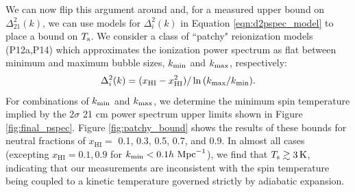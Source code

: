 \documentclass[twocolumn,numberedappendix]{emulateapj} \shorttitle{New Limits on the 21 cm Power Spectrum at $z=8.4$}
\newcommand{\hMpci}{h\ {\rm Mpc}^{-1}}
\newcommand{\Tspin}{T_{\rm s}}
\newcommand{\kmin}{k_{\rm min}}
\newcommand{\kmax}{k_{\rm max}}
\begin{document}
We can now flip this argument around and, for a measured upper bound on $\Delta^2_{21}(k)$, we
can use models for $\Delta_i^2(k)$ in Equation \eqref{eqn:d2pspec_model} to place a bound
on $\Tspin$.  
%
We consider a class of ``patchy" reionization models (P12a,P14) which
approximates the ionization power spectrum as flat between minimum and maximum
bubble sizes, $\kmin$ and $\kmax$, respectively:
\begin{equation}\label{eqn:patchy_bound}
    \Delta^{2}_{i}(k) = (x_{\text{HI}} -
x_{\text{HI}}^{2})/\ln{(\kmax/\kmin)}.
\end{equation}
For combinations of $\kmin$ and $\kmax$,
we 
determine the minimum spin temperature 
implied by the $2\sigma$ 21 cm power
spectrum upper limits shown in Figure \ref{fig:final_pspec}.
Figure \ref{fig:patchy_bound} shows the results of these bounds
for neutral fractions of $x_{\text{HI}}=$ 0.1, 0.3, 0.5, 0.7, and 0.9.
In almost all cases (excepting $x_{\text{HI}}=0.1,0.9$ for $\kmin<0.1\hMpci$), 
we find that $\Tspin\gtrsim 3\,\text{K}$, indicating 
that our measurements are inconsistent with the spin temperature
being coupled to a kinetic temperature governed strictly by
adiabatic expansion.
\end{document}
